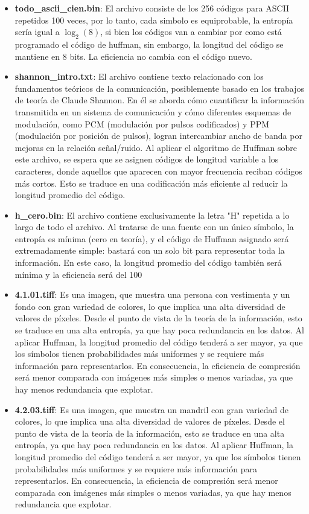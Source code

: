 \documentclass[conference,onecolumn,12pt]{IEEEtran}
\numberwithin{equation}{subsection}
\begin{document}
\begin{itemize}
    \item \textbf{todo\_ascii\_cien.bin}: El archivo consiste de los 256 códigos para ASCII repetidos 100 veces, por lo tanto, cada simbolo es equiprobable, la entropía sería igual a $\log_2(8)$, si bien los códigos van a cambiar por como está programado el código de huffman, sin embargo, la longitud del código se mantiene en 8 bits. La eficiencia no cambia con el código nuevo.
    \item \textbf{shannon\_intro.txt}: El archivo contiene texto relacionado con los fundamentos teóricos de la comunicación, posiblemente basado en los trabajos de teoría de Claude Shannon. En él se aborda cómo cuantificar la información transmitida en un sistema de comunicación y cómo diferentes esquemas de modulación, como PCM (modulación por pulsos codificados) y PPM (modulación por posición de pulsos), logran intercambiar ancho de banda por mejoras en la relación señal/ruido. Al aplicar el algoritmo de Huffman sobre este archivo, se espera que se asignen códigos de longitud variable a los caracteres, donde aquellos que aparecen con mayor frecuencia reciban códigos más cortos. Esto se traduce en una codificación más eficiente al reducir la longitud promedio del código.
    \item \textbf{h\_cero.bin}: El archivo contiene exclusivamente la letra "H" repetida a lo largo de todo el archivo. Al tratarse de una fuente con un único símbolo, la entropía es mínima (cero en teoría), y el código de Huffman asignado será extremadamente simple: bastará con un solo bit para representar toda la información. En este caso, la longitud promedio del código también será mínima y la eficiencia será del 100%
    \item \textbf{4.1.01.tiff}: Es una imagen, que muestra una persona con vestimenta y un fondo con gran variedad de colores, lo que implica una alta diversidad de valores de píxeles. Desde el punto de vista de la teoría de la información, esto se traduce en una alta entropía, ya que hay poca redundancia en los datos. Al aplicar Huffman, la longitud promedio del código tenderá a ser mayor, ya que los símbolos tienen probabilidades más uniformes y se requiere más información para representarlos. En consecuencia, la eficiencia de compresión será menor comparada con imágenes más simples o menos variadas, ya que hay menos redundancia que explotar.
    \item \textbf{4.2.03.tiff}: Es una imagen, que muestra un mandril con gran variedad de colores, lo que implica una alta diversidad de valores de píxeles. Desde el punto de vista de la teoría de la información, esto se traduce en una alta entropía, ya que hay poca redundancia en los datos. Al aplicar Huffman, la longitud promedio del código tenderá a ser mayor, ya que los símbolos tienen probabilidades más uniformes y se requiere más información para representarlos. En consecuencia, la eficiencia de compresión será menor comparada con imágenes más simples o menos variadas, ya que hay menos redundancia que explotar.

\end{itemize}
\end{document}
